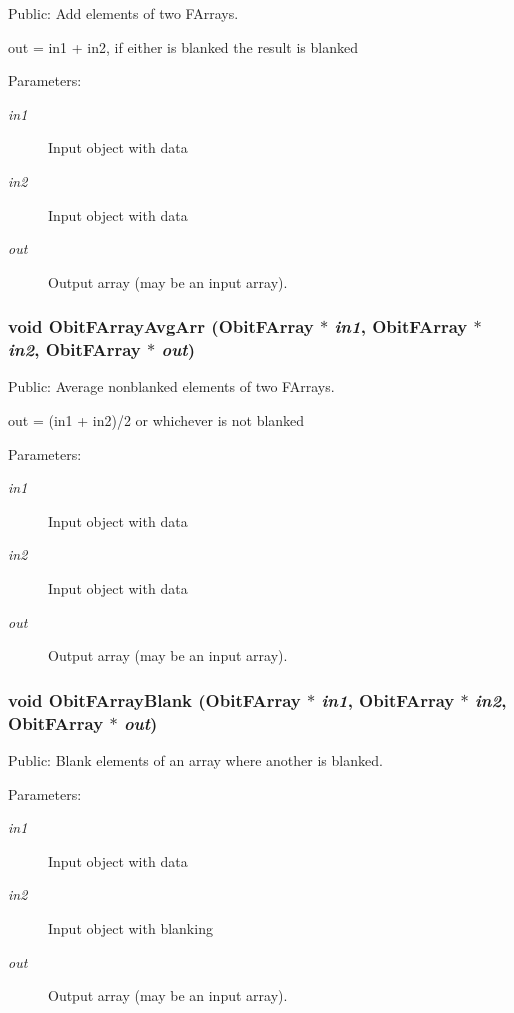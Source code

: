 Public: Add elements of two FArrays. 

out = in1 + in2, if either is blanked the result is blanked \begin{Desc}
\item[Parameters:]
\begin{description}
\item[{\em in1}]Input object with data \item[{\em in2}]Input object with data \item[{\em out}]Output array (may be an input array). \end{description}
\end{Desc}
\subsubsection{\setlength{\rightskip}{0pt plus 5cm}void Obit\-FArray\-Avg\-Arr ({\bf Obit\-FArray} $\ast$ {\em in1}, {\bf Obit\-FArray} $\ast$ {\em in2}, {\bf Obit\-FArray} $\ast$ {\em out})}\label{ObitFArray_8h_a92}


Public: Average nonblanked elements of two FArrays. 

out = (in1 + in2)/2 or whichever is not blanked \begin{Desc}
\item[Parameters:]
\begin{description}
\item[{\em in1}]Input object with data \item[{\em in2}]Input object with data \item[{\em out}]Output array (may be an input array). \end{description}
\end{Desc}
\subsubsection{\setlength{\rightskip}{0pt plus 5cm}void Obit\-FArray\-Blank ({\bf Obit\-FArray} $\ast$ {\em in1}, {\bf Obit\-FArray} $\ast$ {\em in2}, {\bf Obit\-FArray} $\ast$ {\em out})}\label{ObitFArray_8h_a88}


Public: Blank elements of an array where another is blanked. 

\begin{Desc}
\item[Parameters:]
\begin{description}
\item[{\em in1}]Input object with data \item[{\em in2}]Input object with blanking \item[{\em out}]Output array (may be an input array). \end{description}
\end{Desc}
